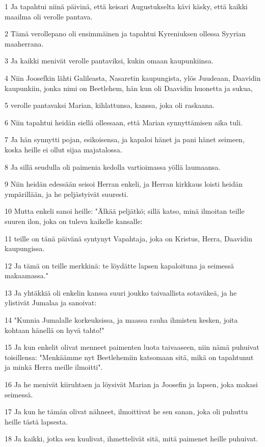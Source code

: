 \par 1 Ja tapahtui niinä päivinä, että keisari Augustukselta kävi käsky, että kaikki maailma oli verolle pantava.
\par 2 Tämä verollepano oli ensimmäinen ja tapahtui Kyreniuksen ollessa Syyrian maaherrana.
\par 3 Ja kaikki menivät verolle pantaviksi, kukin omaan kaupunkiinsa.
\par 4 Niin Joosefkin lähti Galileasta, Nasaretin kaupungista, ylös Juudeaan, Daavidin kaupunkiin, jonka nimi on Beetlehem, hän kun oli Daavidin huonetta ja sukua,
\par 5 verolle pantavaksi Marian, kihlattunsa, kanssa, joka oli raskaana.
\par 6 Niin tapahtui heidän siellä ollessaan, että Marian synnyttämisen aika tuli.
\par 7 Ja hän synnytti pojan, esikoisensa, ja kapaloi hänet ja pani hänet seimeen, koska heille ei ollut sijaa majatalossa.
\par 8 Ja sillä seudulla oli paimenia kedolla vartioimassa yöllä laumaansa.
\par 9 Niin heidän edessään seisoi Herran enkeli, ja Herran kirkkaus loisti heidän ympärillään, ja he peljästyivät suuresti.
\par 10 Mutta enkeli sanoi heille: "Älkää peljätkö; sillä katso, minä ilmoitan teille suuren ilon, joka on tuleva kaikelle kansalle:
\par 11 teille on tänä päivänä syntynyt Vapahtaja, joka on Kristus, Herra, Daavidin kaupungissa.
\par 12 Ja tämä on teille merkkinä: te löydätte lapsen kapaloituna ja seimessä makaamassa."
\par 13 Ja yhtäkkiä oli enkelin kanssa suuri joukko taivaallista sotaväkeä, ja he ylistivät Jumalaa ja sanoivat:
\par 14 "Kunnia Jumalalle korkeuksissa, ja maassa rauha ihmisten kesken, joita kohtaan hänellä on hyvä tahto!"
\par 15 Ja kun enkelit olivat menneet paimenten luota taivaaseen, niin nämä puhuivat toisillensa: "Menkäämme nyt Beetlehemiin katsomaan sitä, mikä on tapahtunut ja minkä Herra meille ilmoitti".
\par 16 Ja he menivät kiiruhtaen ja löysivät Marian ja Joosefin ja lapsen, joka makasi seimessä.
\par 17 Ja kun he tämän olivat nähneet, ilmoittivat he sen sanan, joka oli puhuttu heille tästä lapsesta.
\par 18 Ja kaikki, jotka sen kuulivat, ihmettelivät sitä, mitä paimenet heille puhuivat.
